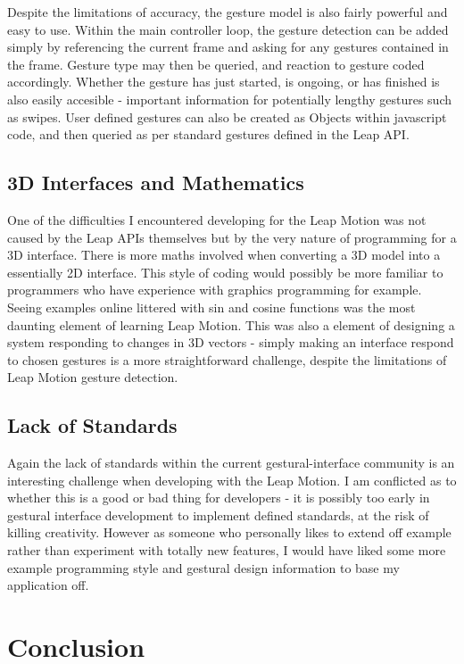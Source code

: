 \documentclass{sigplanconf}
\begin{document}
Despite the limitations of accuracy, the gesture model is also fairly powerful and easy to use. Within the main controller loop, the gesture detection can be added simply by referencing the current frame and asking for any gestures contained in the frame. Gesture type may then be queried, and reaction to gesture coded accordingly. Whether the gesture has just started, is ongoing, or has finished is also easily accesible - important information for potentially lengthy gestures such as swipes. User defined gestures can also be created as Objects within javascript code, and then queried as per standard gestures defined in the Leap API. 

\subsection{3D Interfaces and Mathematics}

One of the difficulties I encountered developing for the Leap Motion was not caused by the Leap APIs themselves but by the very nature of programming for a 3D interface. There is more maths involved when converting a 3D model into a essentially 2D interface. This style of coding would possibly be more familiar to programmers who have experience with graphics programming for example. Seeing examples online littered with sin and cosine functions was the most daunting element of learning Leap Motion. This was also a element of designing a system responding to changes in 3D vectors - simply making an interface respond to chosen gestures is a more straightforward challenge, despite the limitations of Leap Motion gesture detection.

\subsection{Lack of Standards}

Again the lack of standards within the current gestural-interface community is an interesting challenge when developing with the Leap Motion. I am conflicted as to whether this is a good or bad thing for developers - it is possibly too early in gestural interface development to implement defined standards, at the risk of killing creativity. However as someone who personally likes to extend off example rather than experiment with totally new features, I would have liked some more example programming style and gestural design information to base my application off.

\section{Conclusion}
\end{document}

